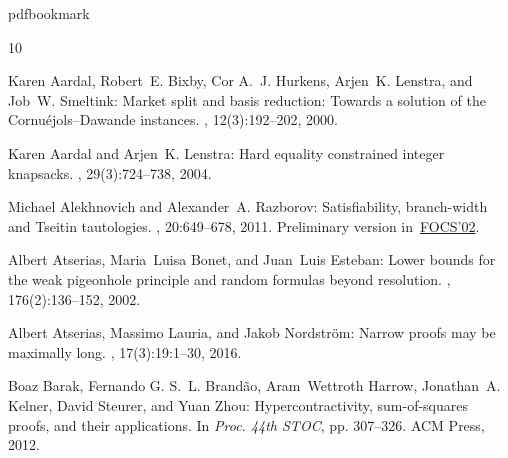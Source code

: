 \documentclass[11pt]{article}
\begin{document}
 




\newcommand{\prelim}{Preliminary version in\ }\newcommand{\prelims}{Preliminary
  versions in\ }
\providecommand{\bibhead}[1]{}
\expandafter\ifx\csname pdfbookmark\endcsname\relax%
  \providecommand{\tocrefpdfbookmark}{}
\else\providecommand{\tocrefpdfbookmark}{%
   \hypertarget{tocreferences}{}%
   \pdfbookmark[1]{References}{tocreferences}}%
\fi

\tocrefpdfbookmark
\begin{thebibliography}{10}

\bibhead{AardalBHLS00}
{\sc Karen Aardal, Robert~E. Bixby, Cor A.~J. Hurkens, Arjen~K. Lenstra, and
  Job~W. Smeltink}: Market split and basis reduction: {T}owards a solution of
  the {C}ornu\'{e}jols--{D}awande instances.
, 12(3):192--202, 2000.

\bibhead{AardalL04}
{\sc Karen Aardal and Arjen~K. Lenstra}: Hard equality constrained integer
  knapsacks.
, 29(3):724--738, 2004.

\bibhead{AlekhnovichR02}
{\sc Michael Alekhnovich and Alexander~A. Razborov}: Satisfiability,
  branch-width and {T}seitin tautologies.
, 20:649--678, 2011.
\newblock \prelim \href{https://doi.org/10.1109/SFCS.2002.1181983}{FOCS'02}.
\newblock [\epfmtdoi{10.1007/s00037-011-0033-1}]

\bibhead{AtseriasBE02}
{\sc Albert Atserias, Maria~Luisa Bonet, and Juan~Luis Esteban}: Lower bounds
  for the weak pigeonhole principle and random formulas beyond resolution.
, 176(2):136--152, 2002.

\bibhead{AtseriasLN16}
{\sc Albert Atserias, Massimo Lauria, and Jakob Nordstr{\"{o}}m}: Narrow proofs
  may be maximally long.
, 17(3):19:1--30, 2016.
\newblock [\epfmtdoi{10.1145/2898435}]

\bibhead{BarakBHKSZ12}
{\sc Boaz Barak, Fernando G. S.~L. Brand{\~{a}}o, Aram~Wettroth Harrow,
  Jonathan~A. Kelner, David Steurer, and Yuan Zhou}: Hypercontractivity,
  sum-of-squares proofs, and their applications.
\newblock In {\em Proc. 44th STOC}, pp. 307--326. ACM Press, 2012.
\newblock [\epfmtdoi{10.1145/2213977.2214006}]


\end{thebibliography}
\end{document}
